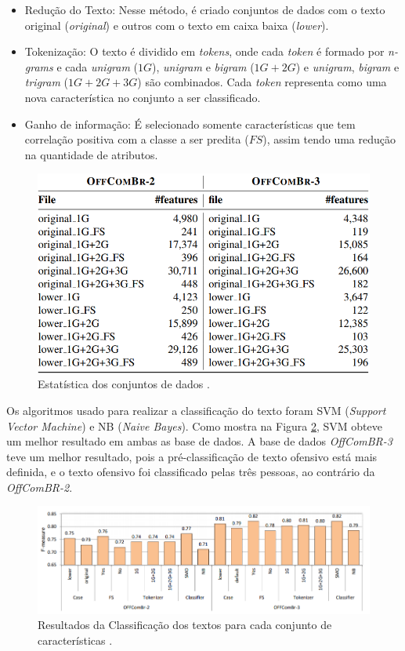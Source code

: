 \begin{itemize}
    \item Redução do Texto: Nesse método, é criado conjuntos de dados com o texto original ({\it original}) e outros com o texto em caixa baixa ({\it lower}).
    \item Tokenização: O texto é dividido em {\it tokens}, onde cada {\it token} é formado por {\it n-grams} e cada {\it unigram} (${1G}$), {\it unigram} e {\it bigram} (${1G+2G}$) e {\it unigram}, {\it bigram} e {\it trigram} (${1G+2G+3G}$) são combinados. Cada {\it token} representa como uma nova característica no conjunto a ser classificado.
    \item Ganho de informação: É selecionado somente características que tem correlação positiva com a classe a ser predita (${FS}$), assim tendo uma redução na quantidade de atributos.
\end{itemize}

\begin{figure}[ht]
  \centering
  \includegraphics[height=0.3\textheight]{figuras/stats-datasets-offcombr.png}
  \caption{Estatística dos conjuntos de dados \cite{Pelle2017}.}
  \label{fig:pelle-statistic}
\end{figure}

Os algoritmos usado para realizar a classificação do texto foram SVM ({\it Support Vector Machine}) e NB ({\it Naive Bayes}). Como mostra na Figura \ref{fig:pelle-results}, SVM obteve um melhor resultado em ambas as base de dados. A base de dados {\it OffComBR-3} teve um melhor resultado, pois a pré-classificação de texto ofensivo está mais definida, e o texto ofensivo foi classificado pelas três pessoas, ao contrário da {\it OffComBR-2}.

\begin{figure}[ht]
  \centering
  \includegraphics[height=0.2\textheight]{figuras/results-datasets-offcombr.png}
  \caption{Resultados da Classificação dos textos para cada conjunto de características \cite{Pelle2017}.}
  \label{fig:pelle-results}
\end{figure}

